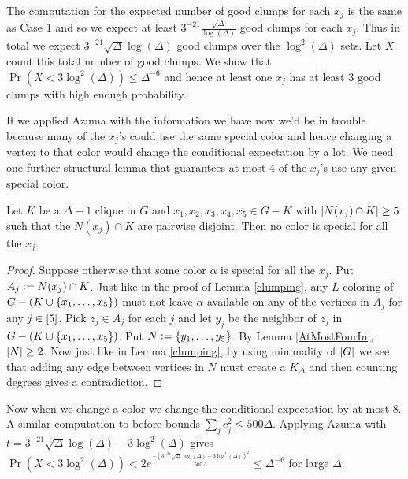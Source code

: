 The computation for the expected number of good clumps for each $x_j$ is the
same as Case 1 and so we expect at least
$3^{-21}\frac{\sqrt{\Delta}}{\log(\Delta)}$ good clumps for each $x_j$.  Thus in
total we expect $3^{-21}\sqrt{\Delta}\log(\Delta)$ good clumps over the
$\log^2(\Delta)$ sets.  Let $X$ count this total number of good clumps.  We show
that $\Pr(X < 3\log^2(\Delta)) \leq \Delta^{-6}$ and hence at least one $x_j$
has at least $3$ good clumps with high enough probability.

If we applied Azuma with the information we have now we'd be in trouble because
many of the $x_j$'s could use the same special color and hence changing a vertex
to that color would change the conditional expectation by a lot.  We need one
further structural lemma that guarantees at most $4$ of the $x_j$'s use any
given special color.

\begin{lem}\label{LastStructure}
Let $K$ be a $\Delta-1$ clique in $G$ and $x_1, x_2, x_3, x_4, x_5 \in G - K$
with $\left|N(x_j) \cap K\right| \geq 5$ such that the $N(x_j) \cap K$ are pairwise
disjoint. Then no color is special for all the $x_j$.
\end{lem}
\begin{proof}
Suppose otherwise that some color $\alpha$ is special for all the $x_j$. Put
$A_j \mathrel{\mathop:}= N(x_j) \cap K$. Just like in the proof of Lemma \ref{clumping},
any $L$-coloring of $G - (K \cup \left\{ x_1, \ldots, x_5 \right\})$ must not leave
$\alpha$ available on any of the vertices in $A_j$ for any $j \in \left[5\right]$.
Pick $z_j \in A_j$ for each $j$ and let $y_j$ be the neighbor of $z_j$ in $G -
(K \cup \left\{ x_1, \ldots, x_5 \right\})$. Put $N \mathrel{\mathop:}= \left\{ y_1, \ldots, y_5 \right\}$. By
Lemma \ref{AtMostFourIn}, $\left|N\right| \geq 2$.  Now just like in Lemma
\ref{clumping}, by using minimality of $\left|G\right|$ we see that adding any edge
between vertices in $N$ must create a $K_\Delta$ and then counting degrees gives
a contradiction.
\end{proof}

Now when we change a color we change the conditional expectation by at most $8$.
A similar computation to before bounds $\sum_j c_j^2 \leq 500\Delta$.  Applying
Azuma with $t = 3^{-21}\sqrt{\Delta}\log(\Delta) - 3\log^2(\Delta)$ gives $\Pr(X
< 3\log^2(\Delta)) < 2e^{\frac{-(3^{-21}\sqrt{\Delta}\log(\Delta) -
3\log^2(\Delta))^2}{500\Delta}} \leq \Delta^{-6}$ for large $\Delta$.
